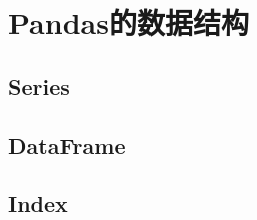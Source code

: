 \chapter{Pandas的数据结构}
\label{cha:pandas_data_structure}
\section{Series}
\label{sec:pandas_series}


\section{DataFrame}
\label{sec:pandas_dataframe}

\section{Index}
\label{sec:pandas_index}



